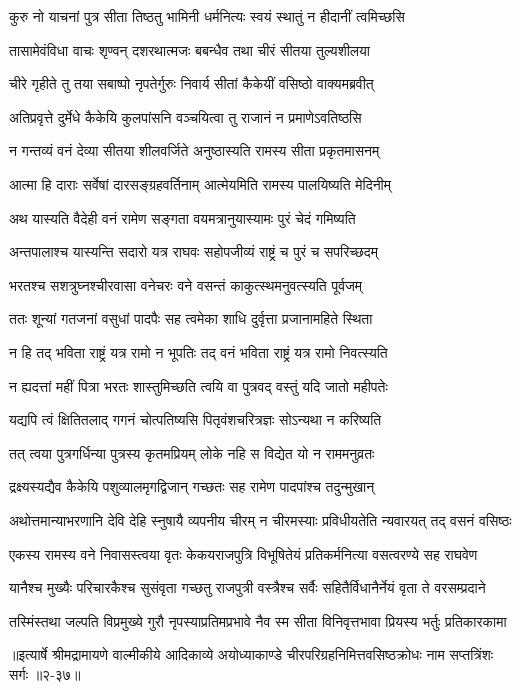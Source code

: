 \twolineshloka
{कुरु नो याचनां पुत्र सीता तिष्ठतु भामिनी}
{धर्मनित्यः स्वयं स्थातुं न हीदानीं त्वमिच्छसि} %

\twolineshloka
{तासामेवंविधा वाचः शृण्वन् दशरथात्मजः}
{बबन्धैव तथा चीरं सीतया तुल्यशीलया} %

\twolineshloka
{चीरे गृहीते तु तया सबाष्पो नृपतेर्गुरुः}
{निवार्य सीतां कैकेयीं वसिष्ठो वाक्यमब्रवीत्} %

\twolineshloka
{अतिप्रवृत्ते दुर्मेधे कैकेयि कुलपांसनि}
{वञ्चयित्वा तु राजानं न प्रमाणेऽवतिष्ठसि} %

\twolineshloka
{न गन्तव्यं वनं देव्या सीतया शीलवर्जिते}
{अनुष्ठास्यति रामस्य सीता प्रकृतमासनम्} %

\twolineshloka
{आत्मा हि दाराः सर्वेषां दारसङ्ग्रहवर्तिनाम्}
{आत्मेयमिति रामस्य पालयिष्यति मेदिनीम्} %

\twolineshloka
{अथ यास्यति वैदेही वनं रामेण सङ्गता}
{वयमत्रानुयास्यामः पुरं चेदं गमिष्यति} %

\twolineshloka
{अन्तपालाश्च यास्यन्ति सदारो यत्र राघवः}
{सहोपजीव्यं राष्ट्रं च पुरं च सपरिच्छदम्} %

\twolineshloka
{भरतश्च सशत्रुघ्नश्चीरवासा वनेचरः}
{वने वसन्तं काकुत्स्थमनुवत्स्यति पूर्वजम्} %

\twolineshloka
{ततः शून्यां गतजनां वसुधां पादपैः सह}
{त्वमेका शाधि दुर्वृत्ता प्रजानामहिते स्थिता} %

\twolineshloka
{न हि तद् भविता राष्ट्रं यत्र रामो न भूपतिः}
{तद् वनं भविता राष्ट्रं यत्र रामो निवत्स्यति} %

\twolineshloka
{न ह्यदत्तां महीं पित्रा भरतः शास्तुमिच्छति}
{त्वयि वा पुत्रवद् वस्तुं यदि जातो महीपतेः} %

\twolineshloka
{यद्यपि त्वं क्षितितलाद् गगनं चोत्पतिष्यसि}
{पितृवंशचरित्रज्ञः सोऽन्यथा न करिष्यति} %

\twolineshloka
{तत् त्वया पुत्रगर्धिन्या पुत्रस्य कृतमप्रियम्}
{लोके नहि स विद्येत यो न राममनुव्रतः} %

\twolineshloka
{द्रक्ष्यस्यद्यैव कैकेयि पशुव्यालमृगद्विजान्}
{गच्छतः सह रामेण पादपांश्च तदुन्मुखान्} %

\twolineshloka
{अथोत्तमान्याभरणानि देवि देहि स्नुषायै व्यपनीय चीरम्}
{न चीरमस्याः प्रविधीयतेति न्यवारयत् तद् वसनं वसिष्ठः} %

\twolineshloka
{एकस्य रामस्य वने निवासस्त्वया वृतः केकयराजपुत्रि}
{विभूषितेयं प्रतिकर्मनित्या वसत्वरण्ये सह राघवेण} %

\twolineshloka
{यानैश्च मुख्यैः परिचारकैश्च सुसंवृता गच्छतु राजपुत्री}
{वस्त्रैश्च सर्वैः सहितैर्विधानैर्नेयं वृता ते वरसम्प्रदाने} %

\twolineshloka
{तस्मिंस्तथा जल्पति विप्रमुख्ये गुरौ नृपस्याप्रतिमप्रभावे}
{नैव स्म सीता विनिवृत्तभावा प्रियस्य भर्तुः प्रतिकारकामा} %


॥इत्यार्षे श्रीमद्रामायणे वाल्मीकीये आदिकाव्ये अयोध्याकाण्डे चीरपरिग्रहनिमित्तवसिष्ठक्रोधः नाम सप्तत्रिंशः सर्गः ॥२-३७॥
